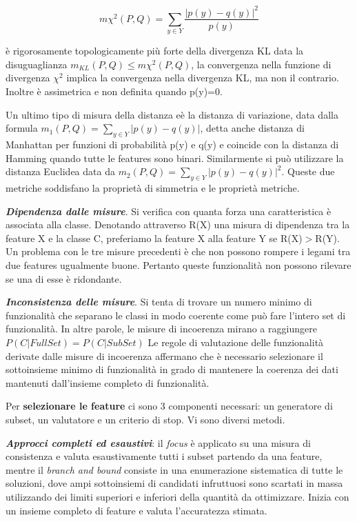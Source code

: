 \documentclass[a4paper]{extarticle}
\begin{document}
\begin{equation}
m \chi ^2(P,Q) = \sum_{y \in Y} \dfrac{|p(y)-q(y)|^2}{p(y)}
\end{equation}

è rigorosamente topologicamente più forte della divergenza KL data la disuguaglianza $m_{KL}(P,Q) \leq m \chi ^2 (P,Q)$, la convergenza nella funzione di divergenza $\chi ^2$ implica la convergenza nella divergenza KL, ma non il contrario. Inoltre è assimetrica e non definita quando p(y)=0.

Un ultimo tipo di misura della distanza eè la distanza di variazione, data dalla formula $m_1 (P,Q)= \sum_{y \in Y}|p(y)-q(y)|$, detta anche distanza di Manhattan per funzioni di probabilità p(y) e q(y) e coincide con la distanza di Hamming quando tutte le features sono binari. Similarmente si può utilizzare la distanza Euclidea data da $m_2 (P,Q)= \sum_{y \in Y} |p(y)-q(y)|^2$. Queste due metriche soddisfano la proprietà di simmetria e le proprietà metriche.

\textbf{\textit{Dipendenza dalle misure}}. Si verifica con quanta forza una caratteristica è associata alla classe. Denotando attraverso R(X) una misura di dipendenza tra la feature X e la classe C, preferiamo la feature X alla feature Y se R(X)$>$R(Y). Un problema con le tre misure precedenti è che non possono rompere i legami tra due features ugualmente buone. Pertanto queste funzionalità non possono rilevare se una di esse è ridondante.

\textbf{\textit{Inconsistenza delle misure}}. Si tenta di trovare un numero minimo di funzionalità che separano le classi in modo coerente come può fare l'intero set di funzionalità. In altre parole, le misure di incoerenza mirano a raggiungere $P(C|FullSet)= P(C|SubSet)$ Le regole di valutazione delle funzionalità derivate dalle misure di incoerenza affermano che è necessario selezionare il sottoinsieme minimo di funzionalità in grado di mantenere la coerenza dei dati mantenuti dall'insieme completo di funzionalità.

Per \textbf{selezionare le feature} ci sono 3 componenti necessari: un generatore di subset, un valutatore e un criterio di stop. Vi sono diversi metodi. 

\textbf{\textit{Approcci completi ed esaustivi}}: il \textit{focus} è applicato su una misura di consistenza e valuta esaustivamente tutti i subset partendo da una feature, mentre il \textit{branch and bound} consiste in una enumerazione sistematica di tutte le soluzioni, dove ampi sottoinsiemi di candidati infruttuosi sono scartati in massa utilizzando dei limiti superiori e inferiori della quantità da ottimizzare. Inizia con un insieme completo di feature e valuta l'accuratezza stimata. 
\end{document}
